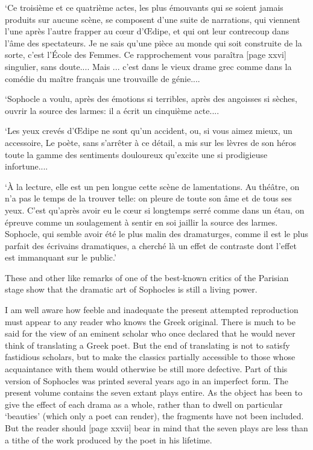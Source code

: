\documentclass[11pt,letter]{book}
\begin{document}
\par  ‘Ce troisième et ce quatrième actes, les plus émouvants qui se soient jamais produits sur aucune scène, se composent d’une suite de narrations, qui viennent l’une après l’autre frapper au cœur d’Œdipe, et qui ont leur contrecoup dans l’âme des spectateurs. Je ne sais qu’une pièce au monde qui soit construite de la sorte, c’est l’École des Femmes. Ce rapprochement vous paraîtra [page xxvi] singulier, sans doute.... Mais ... c’est dans le vieux drame grec comme dans la comédie du maître français une trouvaille de génie....

\par  ‘Sophocle a voulu, après des émotions si terribles, après des angoisses si sèches, ouvrir la source des larmes: il a écrit un cinquième acte....

\par  ‘Les yeux crevés d’Œdipe ne sont qu’un accident, ou, si vous aimez mieux, un accessoire, Le poète, sans s’arrêter à ce détail, a mis sur les lèvres de son héros toute la gamme des sentiments douloureux qu’excite une si prodigieuse infortune....

\par  ‘À la lecture, elle est un pen longue cette scène de lamentations. Au théâtre, on n’a pas le temps de la trouver telle: on pleure de toute son âme et de tous ses yeux. C’est qu’après avoir eu le cœur si longtemps serré comme dans un étau, on épreuve comme un soulagement à sentir en soi jaillir la source des larmes. Sophocle, qui semble avoir été le plus malin des dramaturges, comme il est le plus parfait des écrivains dramatiques, a cherché là un effet de contraste dont l’effet est immanquant sur le public.’

\par  These and other like remarks of one of the best-known critics of the Parisian stage show that the dramatic art of Sophocles is still a living power.

\par  I am well aware how feeble and inadequate the present attempted reproduction must appear to any reader who knows the Greek original. There is much to be said for the view of an eminent scholar who once declared that he would never think of translating a Greek poet. But the end of translating is not to satisfy fastidious scholars, but to make the classics partially accessible to those whose acquaintance with them would otherwise be still more defective. Part of this version of Sophocles was printed several years ago in an imperfect form. The present volume contains the seven extant plays entire. As the object has been to give the effect of each drama as a whole, rather than to dwell on particular ‘beauties’ (which only a poet can render), the fragments have not been included. But the reader should [page xxvii] bear in mind that the seven plays are less than a tithe of the work produced by the poet in his lifetime.
\end{document}
